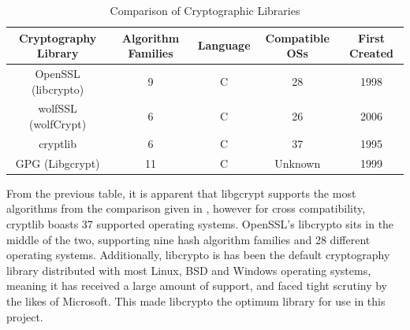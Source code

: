 \documentclass[a4paper, 11pt]{report}
\begin{document}
\begin{table}[H]
\centering
\begin{tabular}{ |c|c|c|c|c| } 
\hline
Cryptography Library & Algorithm Families & Language & Compatible OSs & First Created\\
\hline
OpenSSL (libcrypto)\cite{libcrypto} & 9 & C & 28 & 1998\\
wolfSSL (wolfCrypt)\cite{wolfCrypt} & 6 & C & 26 & 2006\\
cryptlib\cite{cryptlib} & 6 & C & 37 & 1995\\
GPG (Libgcrypt)\cite{libgcrypt} & 11 & C & Unknown & 1999\\
\hline
\end{tabular}
\caption{Comparison of Cryptographic Libraries}
\label{tab:cryptolib}
\end{table}

From the previous table, it is apparent that libgcrypt supports the most algorithms from the comparison given in \cite{hashlibcomp}, however for cross compatibility, cryptlib boasts 37 supported operating systems. OpenSSL's libcrypto sits in the middle of the two, supporting nine hash algorithm families and 28 different operating systems. Additionally, libcrypto is has been the default cryptography library distributed with most Linux, BSD and Windows operating systems, meaning it has received a large amount of support, and faced tight scrutiny by the likes of Microsoft. This made libcrypto the optimum library for use in this project. 
\end{document}
